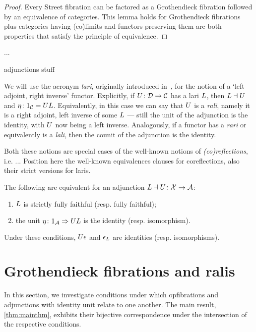 \documentclass{amsart}
\begin{document}
\begin{proof}
  Every Street fibration can be factored as a Grothendieck
  fibration followed by an equivalence of categories.  This
  lemma holds for Grothendieck fibrations plus categories having
  (co)limits and functors preserving them are both properties
  that satisfy the principle of equivalence.  
\end{proof}


...

{\chris adjunctions stuff}

We will use the acronym \emph{lari}, originally introduced in~\cite{Grayfibredandcofibred}, for the notion of a `left adjoint, right inverse' functor. Explicitly, if $U\colon\mathcal{D}\to\mathcal{C}$ has a lari $L$, then $L\dashv U$ and $\eta\colon1_\mathcal{C}=UL$. Equivalently, in this case we can say that $U$ is a \emph{rali}, namely it is a right adjoint, left inverse of some $L$ --- still the unit of the adjunction is the identity, with $U$ now being a left inverse. Analogously, if a functor has a \emph{rari} or equivalently is a \emph{lali}, then the counit of the adjunction is the identity.

Both these notions are special cases of the well-known notions of \emph{(co)reflections}, i.e. ...
{\chris Position here the well-known equivalences clauses for coreflections, also their strict versions for laris.}
\begin{prop}\label{prop:coreflection}
 The following are equivalent for an adjunction $L\dashv U\colon\mathcal{X}\to\mathcal{A}$:
 \begin{enumerate}
  \item $L$ is strictly fully faithful (resp. fully faithful);
  \item the unit $\eta\colon1_\mathcal{A}\Rightarrow UL$ is the identity (resp. isomorphism).
 \end{enumerate}
Under these conditions, $U\epsilon$ and $\epsilon_L$ are identities (resp. isomorphisms).
\end{prop}


\section{Grothendieck fibrations and ralis}
\label{sec:groth-fibs-ralis}

In this section, we investigate conditions under which opfibrations and adjunctions with identity unit relate to one another. The main result, \cref{thm:mainthm}, exhibits their bijective correspondence under the intersection of the respective conditions.
\end{document}
